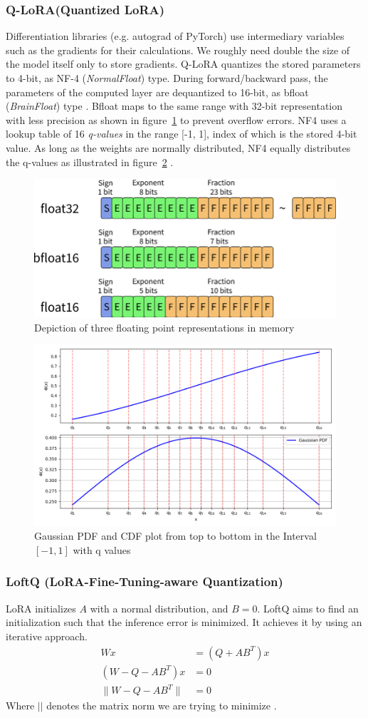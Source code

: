 \documentclass{article}
\begin{document}
\subsubsection{Q-LoRA(Quantized LoRA)}\label{qlora}
Differentiation libraries (e.g. autograd of PyTorch) use intermediary variables such as the gradients for their calculations. We roughly need double the size of the model itself only to store gradients. Q-LoRA quantizes the stored parameters to 4-bit, as NF-4 (\textit{NormalFloat}) type. During forward/backward pass, the parameters of the computed layer are dequantized to 16-bit, as bfloat (\textit{BrainFloat}) type \cite{dettmers_qlora_2023}. Bfloat maps to the same range with 32-bit representation with less precision as shown in figure~\ref{fig:bfloat} to prevent overflow errors. NF4 uses a lookup table of 16 \textit{q-values} in the range [-1, 1], index of which is the stored 4-bit value. As long as the weights are normally distributed, NF4 equally distributes the q-values  as illustrated in figure~\ref{fig:nf4} \cite{dettmers_8-bit_2022}.

\begin{figure}[H]
    \centering
    \includegraphics[width=0.5\linewidth]{pictures/bfloat.png}
    \caption{Depiction of three floating point representations in memory \cite{grobbelaar_pygmalionaipygmalion-7b_2023}}
    \label{fig:bfloat}
\end{figure}

\begin{figure}[H]
    \centering
    \includegraphics[width=0.5\linewidth]{pictures/nf4.png}
    \caption{Gaussian PDF and CDF plot from top to bottom in the Interval $[-1, 1]$ with q values}
    \label{fig:nf4}
\end{figure}
\subsubsection{LoftQ (LoRA-Fine-Tuning-aware Quantization)}
LoRA initializes $A$ with a normal distribution, and $B=0$. LoftQ aims to find an initialization such that the inference error is minimized. It achieves it by using an iterative approach.
\begin{align}
    Wx &= (Q+AB^T)x\\
    (W-Q-AB^T)x &= 0\\
    \lVert W-Q-AB^T\rVert &= 0
\end{align}
Where $\vert\vert$ denotes the matrix norm we are trying to minimize \cite{li_loftq_2023}.
\end{document}
